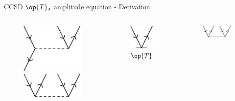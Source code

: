 \begin{frame}{CCSD $\op{T}_2$ amplitude equation - Derivation }
\begin{columns}[t]
\begin{figure}
        \parbox{0.20\textwidth}{
            \centering
            \includegraphics[scale=0.35]{graphics/v8}} 
        \parbox{0.20\textwidth}{
            \centering
            \includegraphics[scale=0.35]{graphics/v9}} 
    \end{figure}
    \begin{figure}
        \caption{$\op{T}$}
        \centering
        \parbox[height=3cm]{0.60\textwidth}{
            \centering
            \includegraphics[scale=0.45]{graphics/t1}} 
    \end{figure}
    \begin{figure}
        \parbox[height=3cm]{0.60\textwidth}{
            \centering
            \includegraphics[scale=0.45]{graphics/t2}} 
    \end{figure}
\end{columns}


\end{frame}

